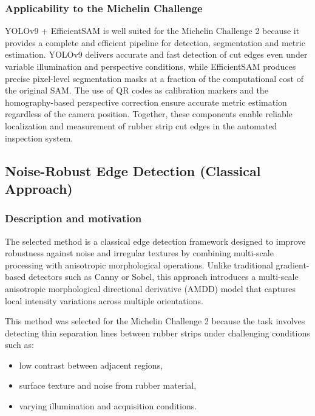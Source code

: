 \documentclass[11pt]{article}
\begin{document}
\subsubsection{Applicability to the Michelin Challenge}

YOLOv9 + EfficientSAM is well suited for the Michelin Challenge 2 because it provides 
a complete and efficient pipeline for detection, segmentation and metric estimation. 
YOLOv9 delivers accurate and fast detection of cut edges even under variable 
illumination and perspective conditions, while EfficientSAM produces precise 
pixel-level segmentation masks at a fraction of the computational cost of the original 
SAM. The use of QR codes as calibration markers and the homography-based perspective 
correction ensure accurate metric estimation regardless of the camera position. 
Together, these components enable reliable localization and measurement of rubber 
strip cut edges in the automated inspection system.


\subsection{Noise-Robust Edge Detection (Classical Approach)}

\subsubsection{Description and motivation}

The selected method is a classical edge detection framework designed to improve robustness against noise and irregular textures by combining multi-scale processing with anisotropic morphological operations. Unlike traditional gradient-based detectors such as Canny or Sobel, this approach introduces a multi-scale anisotropic morphological directional derivative (AMDD) model that captures local intensity variations across multiple orientations.

This method was selected for the Michelin Challenge 2 because the task involves detecting thin separation lines between rubber strips under challenging conditions such as:
\begin{itemize}
    \item low contrast between adjacent regions,
    \item surface texture and noise from rubber material,
    \item varying illumination and acquisition conditions.
\end{itemize}
\end{document}
